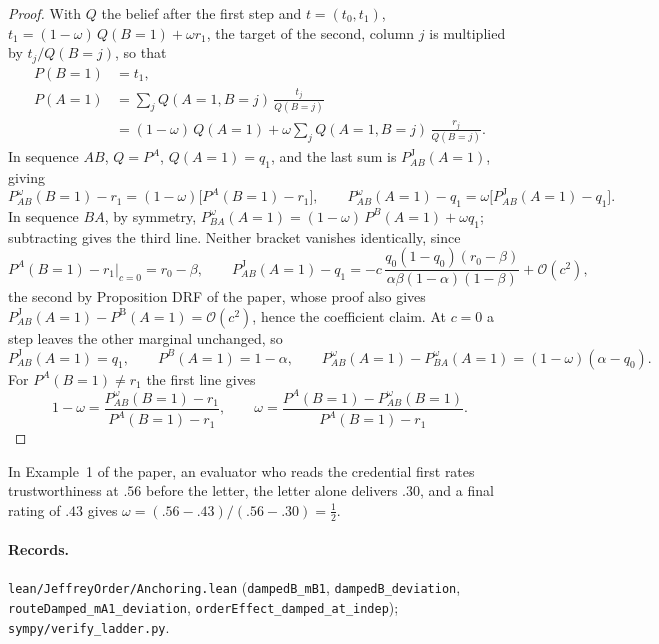 \documentclass[11pt,a4paper]{article}
\newcommand{\PB}{P^{\mathrm{B}}}
\newcommand{\PJ}{P^{\mathrm{J}}}
\newcommand{\bigO}{\mathcal{O}}
\begin{document}
\begin{proof}[Proof]

With $Q$ the belief after the first step and $t=(t_0,t_1)$,
$t_1=(1-\omega)\,Q(B{=}1)+\omega r_1$, the target of the second, column $j$
is multiplied by $t_j/Q(B{=}j)$, so that
\[
\begin{aligned}
  P(B{=}1)&=t_1,\\
  P(A{=}1)&=\sum_j Q(A{=}1,B{=}j)\,\frac{t_j}{Q(B{=}j)}\\
  &=(1-\omega)\,Q(A{=}1)+\omega\sum_j Q(A{=}1,B{=}j)\,\frac{r_j}{Q(B{=}j)}.
\end{aligned}
\]
In sequence $AB$, $Q=P^{A}$, $Q(A{=}1)=q_1$, and the last sum is
$\PJ_{AB}(A{=}1)$, giving
\[
  P^{\omega}_{AB}(B{=}1)-r_1=(1-\omega)\bigl[P^{A}(B{=}1)-r_1\bigr],\qquad
  P^{\omega}_{AB}(A{=}1)-q_1=\omega\bigl[\PJ_{AB}(A{=}1)-q_1\bigr].
\]
In sequence $BA$, by symmetry,
$P^{\omega}_{BA}(A{=}1)=(1-\omega)\,P^{B}(A{=}1)+\omega q_1$; subtracting
gives the third line. Neither bracket vanishes identically, since
\[
  P^{A}(B{=}1)-r_1\Big|_{c=0}=r_0-\beta,\qquad
  \PJ_{AB}(A{=}1)-q_1=-c\,\frac{q_0(1-q_0)(r_0-\beta)}{\alpha\beta(1-\alpha)(1-\beta)}+\bigO(c^2),
\]
the second by Proposition DRF of the paper, whose proof also gives
$\PJ_{AB}(A{=}1)-\PB(A{=}1)=\bigO(c^2)$, hence the coefficient claim. At
$c=0$ a step leaves the other marginal unchanged, so
\[
  \PJ_{AB}(A{=}1)=q_1,\qquad P^{B}(A{=}1)=1-\alpha,\qquad
  P^{\omega}_{AB}(A{=}1)-P^{\omega}_{BA}(A{=}1)=(1-\omega)(\alpha-q_0).
\]
For $P^{A}(B{=}1)\neq r_1$ the first line gives
\[
  1-\omega=\frac{P^{\omega}_{AB}(B{=}1)-r_1}{P^{A}(B{=}1)-r_1},\qquad
  \omega=\frac{P^{A}(B{=}1)-P^{\omega}_{AB}(B{=}1)}{P^{A}(B{=}1)-r_1}.
\]
\end{proof}

In Example~1 of the paper, an evaluator who reads the credential
first rates trustworthiness at $.56$ before the letter, the letter alone delivers
$.30$, and a final rating of $.43$ gives $\omega=(.56-.43)/(.56-.30)=\tfrac12$.

{\raggedright\paragraph{Records.} \texttt{lean/JeffreyOrder/Anchoring.lean} (\texttt{dampedB\_mB1},
\texttt{dampedB\_deviation}, \texttt{routeDamped\_mA1\_deviation},
\texttt{orderEffect\_damped\_at\_indep}); \texttt{sympy/verify\_ladder.py}.\par}
\end{document}

